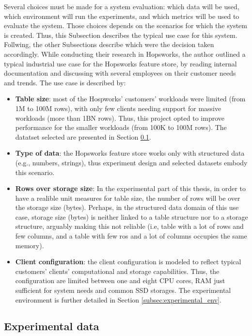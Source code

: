 Several choices must be made for a system evaluation: which data will be used, which environment will run the experiments, and which metrics will be used to evaluate the system. Those choices depends on the scenarios for which the system is created. Thus, this Subsection describes the typical use case for this system. Follwing, the other Subsections describe which were the decision taken accordingly. While conducting their research in Hopsworks, the author outlined a typical industrial use case for the Hopsworks feature store, by reading internal documentation and discussing with several employees on their customer needs and trends. The use case is described by:
\begin{itemize}  
  \item \textbf{Table size}: most of the Hospworks' customers' workloads were limited (from 1M to 100M rows), with only few clients needing support for massive workloads (more than 1BN rows). Thus, this project opted to improve performance for the smaller workloads (from 100K to 100M rows). The datatset selected are presented in Section \ref{subsec:experimental_data}.
  \item \textbf{Type of data}: the Hopsworks feature store works only with structured data (e.g., numbers, strings), thus experiment design and selected datasets embody this scenario.
  \item \textbf{Rows over storage size}: In the experimental part of this thesis, in order to have a realible unit measures for table size, the number of rows will be over the storage size (bytes). Perhaps, in the structured data domain of this use case, storage size (bytes) is neither linked to a table structure nor to a storage structure, arguably making this not reliable (i.e, table with a lot of rows and few columns, and a table with few ros and a lot of columns occupies the same memory).
  \item \textbf{Client configuration}: the client configuration is modeled to reflect typical customers' clients' computational and storage capabilities. Thus, the configuration are limited between one and eight \gls{CPU} cores, \gls{RAM} just sufficient for system needs and common \gls{SSD} storages. The experimental environment is further detailed in Section \ref{subsec:experimental_env}.
\end{itemize}



\subsection{Experimental data}
\label{subsec:experimental_data}



